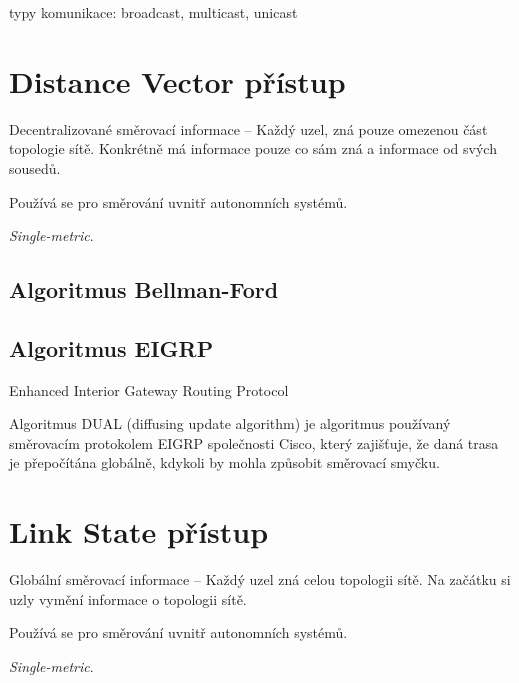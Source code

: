 typy komunikace: broadcast, multicast, unicast


\section{Distance Vector přístup}

\begin{compactitem}
    \item Decentralizované směrovací informace -- Každý uzel, zná pouze omezenou část topologie sítě. Konkrétně má informace pouze co sám zná a informace od svých sousedů.
    \item Používá se pro směrování uvnitř autonomních systémů.
    \item \textit{Single-metric}.
\end{compactitem}

\subsection*{Algoritmus Bellman-Ford}



\subsection*{Algoritmus EIGRP}

Enhanced Interior Gateway Routing Protocol

Algoritmus DUAL (diffusing update algorithm) je algoritmus používaný směrovacím protokolem EIGRP společnosti Cisco, který zajišťuje, že daná trasa je přepočítána globálně, kdykoli by mohla způsobit směrovací smyčku.



\section{Link State přístup}

\begin{compactitem}
    \item Globální směrovací informace -- Každý uzel zná celou topologii sítě. Na začátku si uzly vymění informace o topologii sítě.
    \item Používá se pro směrování uvnitř autonomních systémů.
    \item \textit{Single-metric}.
\end{compactitem}

